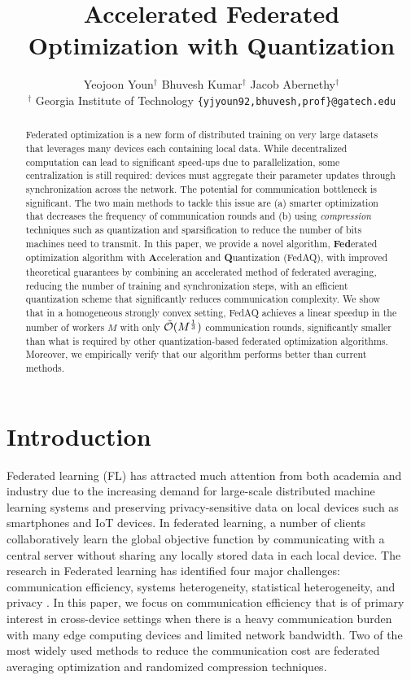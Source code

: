 \documentclass[11pt]{article}
\title{Accelerated Federated Optimization with Quantization}
\author{Yeojoon Youn$^{\dagger}$
\hspace{2em} Bhuvesh Kumar$^{\dagger}$
\hspace{2em} Jacob Abernethy$^{\dagger}$ \\
$^{\dagger}$ Georgia Institute of Technology \hspace{1em}
\texttt{\small\{yjyoun92,bhuvesh,prof\}@gatech.edu}
}
\begin{document}
\maketitle

\begin{abstract}
  Federated optimization is a new form of distributed training on very large datasets that leverages many devices each containing local data. While decentralized computation can lead to significant speed-ups due to parallelization, some centralization is still required: devices must aggregate their parameter updates through synchronization across the network. The potential for communication bottleneck is significant. The two main methods to tackle this issue are (a) smarter optimization that decreases the frequency of communication rounds and (b) using \emph{compression} techniques such as quantization and sparsification to reduce the number of bits machines need to transmit. In this paper, we provide a novel algorithm,  \textbf{Fed}erated optimization algorithm with \textbf{A}cceleration and \textbf{Q}uantization (FedAQ), with improved theoretical guarantees by combining an accelerated method of federated averaging, reducing the number of training and synchronization steps, with an efficient quantization scheme that significantly reduces communication complexity. We show that in a homogeneous strongly convex setting, FedAQ achieves a linear speedup in the number of workers $M$ with only $\Tilde{\mathcal{O}}(M^{\frac{1}{3}})$ communication rounds, significantly smaller than what is required by other quantization-based federated optimization algorithms. Moreover, we empirically verify that our algorithm performs better than current methods.
\end{abstract}

\section{Introduction}

Federated learning (FL) has attracted much attention from both academia and industry due to the increasing demand for large-scale distributed machine learning systems and preserving privacy-sensitive data on local devices such as smartphones and IoT devices. In federated learning, a number of clients collaboratively learn the global objective function by communicating with a central server without sharing any locally stored data in each local device. The research in Federated learning has identified four major challenges: communication efficiency, systems heterogeneity, statistical heterogeneity, and privacy \cite{Yeojoon-li2020federated}. In this paper, we focus on communication efficiency that is of primary interest in cross-device settings when there is a heavy communication burden with many edge computing devices and limited network bandwidth. Two of the most widely used methods to reduce the communication cost are federated averaging optimization and randomized compression techniques.
\end{document}
